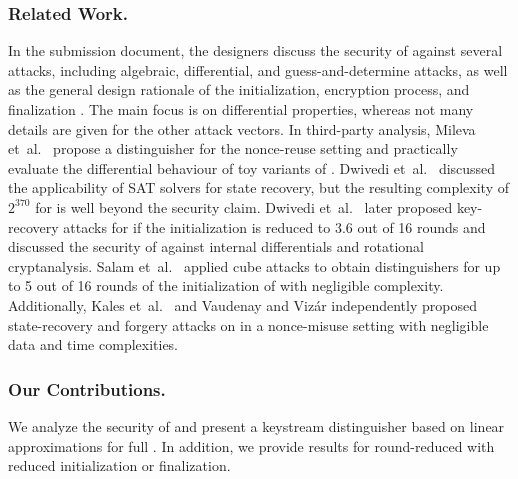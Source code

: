 \subsubsection*{Related Work.}
In the submission document, the designers discuss the security of \morus against
several attacks, including algebraic, differential, and guess-and-determine attacks,
as well as the general design rationale of the initialization, encryption process, and finalization \cite{MORUS}.
The main focus is on differential properties, whereas not many details are given for the other attack vectors.
In third-party analysis,
Mileva et~al.~\cite{balkancryptsecMilevaDV15} propose a distinguisher for the nonce-reuse setting and practically evaluate the differential behaviour of toy variants of \morus.
Dwivedi et~al.~\cite{cryptoeprint:2016:1053} discussed the applicability of SAT solvers for state recovery, but the resulting complexity of $2^{370}$ for \morus[640] is well beyond the security claim.
Dwivedi et~al.~\cite{secryptDwivediMW17} later proposed key-recovery attacks for \morus[1280] if the initialization is reduced to 3.6 out of 16 rounds and discussed the security of \morus against internal differentials and rotational cryptanalysis.
Salam et~al.~\cite{trustcomSalamSBDPW17} applied cube attacks to obtain distinguishers for up to 5 out of 16 rounds of the initialization of \morus[1280] with negligible complexity.
Additionally, 
Kales et~al.~\cite{cryptoeprint:2017:1137} and
Vaudenay and Viz\'{a}r \cite{cryptoeprint:2017:1147}
independently proposed state-recovery and forgery attacks on \morus in a nonce-misuse setting with negligible data and time complexities.


\subsubsection*{Our Contributions.}
We analyze the security of \morus and present a keystream distinguisher based on
linear approximations for full \morus[1280].
In addition, we provide results for round-reduced \morus with reduced initialization or finalization.

